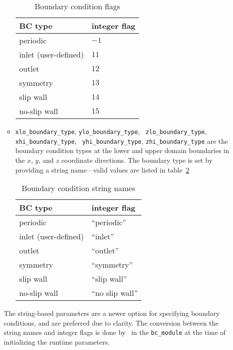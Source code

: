 \begin{itemize}
\begin{itemize}
   \begin{table}[h]
   \caption{\label{gs:table:bcflags} Boundary condition flags}  
   \begin{center}
   \begin{tabular}{ll}
   \hline
   BC type    & integer flag \\
   \hline
   periodic             & $-1$ \\
   inlet (user-defined) & $11$ \\
   outlet               & $12$ \\
   symmetry             & $13$ \\
   slip wall            & $14$ \\
   no-slip wall         & $15$ \\
   \hline
   \end{tabular}
   \end{center}
   \end{table}

   \item {\tt xlo\_boundary\_type}, {\tt ylo\_boundary\_type}, {\tt
   zlo\_boundary\_type}, {\tt xhi\_boundary\_type}, {\tt
   yhi\_boundary\_type}, {\tt zhi\_boundary\_type} are the boundary
   condition types at the lower and upper domain boundaries in 
   the $x$, $y$, and $z$ coordinate directions.   The boundary
   type is set by providing a string name---valid values are listed
   in table~\ref{gs:table:bcstrings}

   \begin{table}[h]
   \caption{\label{gs:table:bcstrings} Boundary condition string names}  
   \begin{center}
   \begin{tabular}{ll}
   \hline
   BC type    & integer flag \\
   \hline
   periodic             & ``periodic'' \\
   inlet (user-defined) & ``inlet'' \\
   outlet               & ``outlet'' \\
   symmetry             & ``symmetry'' \\
   slip wall            & ``slip wall'' \\
   no-slip wall         & ``no slip wall'' \\
   \hline
   \end{tabular}
   \end{center}
   \end{table}

   \end{itemize}

  The string-based parameters are a newer option for specifying
  boundary conditions, and are preferred due to clarity.  The
  conversion between the string names and integer flags is done
  by \boxlib\ in the {\tt bc\_module} at the time of initializing
  the runtime parameters.

\end{itemize}

